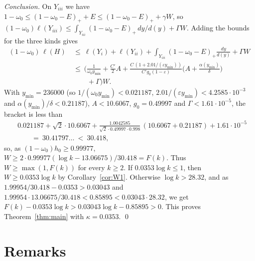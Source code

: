 \documentclass[11pt]{amsart}
\theoremstyle{definition}
\theoremstyle{remark}
\begin{document}
\smallskip\noindent\emph{Conclusion.} On $Y_{iii}$ we have $1-\omega_0\le(1-\omega_0-E)_++E\le(1-\omega_0-E)_++\gamma W$, so
$(1-\omega_0)\ell(Y_{iii})\le\int_{Y_{iii}}(1-\omega_0-E)_+\,dy/d(y)+\Gamma W$. Adding the bounds for the three kinds gives
\begin{align*}
(1-\omega_0)\,\ell(H)\ &\le\ \ell(Y_i)+\ell(Y_{ii})+\int_{Y_{iii}}(1-\omega_0-E)_+\frac{dy}{d(y)}+\Gamma W\\
&\le\ \Big(\frac1{\omega_0y_{\min}}+\frac{C'}2A+\frac{C\,(1+2.01/(\varepsilon y_{\min}))}{C'g_0(1-\varepsilon)}\Big(A+\frac{\alpha(y_{\min})}\delta\Big)\\
&\qquad+\Gamma\Big)W .
\end{align*}
With $y_{\min}=236000$ (so $1/(\omega_0y_{\min})<0.021187$, $2.01/(\varepsilon y_{\min})<4.2585\cdot10^{-3}$ and
$\alpha(y_{\min})/\delta<0.21187$), $A<10.6067$, $g_0=0.49997$ and $\Gamma<1.61\cdot10^{-5}$, the bracket is less than
\begin{align*}
&0.021187+\sqrt2\cdot10.6067+\frac{1.0042585}{\sqrt2\cdot0.49997\cdot0.998}\,(10.6067+0.21187)+1.61\cdot10^{-5}\\
&\qquad=\ 30.41797\ldots\ <\ 30.418,
\end{align*}
so, as $(1-\omega_0)h_0\ge0.99977$, $W\ge2\cdot0.99977(\log k-13.06675)/30.418=F(k)$. Thus $W\ge\max(1,F(k))$ for every $k\ge2$. If
$0.0353\log k\le1$, then $W\ge0.0353\log k$ by Corollary~\ref{cor:W1}. Otherwise $\log k>28.32$, and as
$1.99954/30.418-0.0353>0.03043$ and $1.99954\cdot13.06675/30.418<0.85895<0.03043\cdot28.32$, we get
$F(k)-0.0353\log k>0.03043\log k-0.85895>0$. This proves Theorem~\ref{thm:main} with $\kappa=0.0353$. \qed

\section{Remarks}
\end{document}
